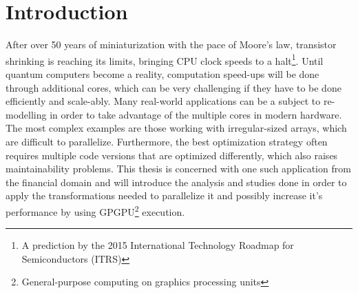 \chapter{Introduction}
\label{chapter:Introduction}
After over 50 years of miniaturization with the pace of Moore's law\cite{cmcoic}, transistor shrinking is reaching its limits, bringing CPU clock speeds to a halt\footnote{A prediction by the 2015 International Technology Roadmap for Semiconductors (ITRS)}. Until quantum computers become a reality, computation speed-ups will be done through additional cores, which can be very challenging if they have to be done efficiently and scale-ably. Many real-world applications can be a subject to re-modelling in order to take advantage of the multiple cores in modern hardware. The most complex examples are those working with irregular-sized arrays, which are difficult to parallelize. Furthermore, the best optimization strategy often requires multiple code versions that are optimized differently, which also raises maintainability problems\cite{FinPar:TACO}. This thesis is concerned with one such application from the financial domain and will introduce the analysis and studies done in order to apply the transformations needed to parallelize it and possibly increase it's performance by using GPGPU\footnote{General-purpose computing on graphics processing units} execution.

